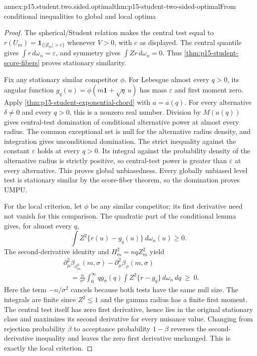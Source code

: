 \begin{annexitem}{annex:p15.student.two.sided.optimal}{thm:p15-student-two-sided-optimal}{From conditional inequalities to global and local optima}
\begin{proof}
The spherical/Student relation makes the
central test equal to
\(r(U_m)=\mathbf1_{\{|Z_m|>c\}}\) whenever
\(V>0\), with \(c\) as displayed.
The central quantile gives
\(\int r\,d\omega_n=\varepsilon\), and
symmetry gives \(\int Zr\,d\omega_n=0\).
Thus \cref{thm:p15-student-score-fibers}
proves stationary similarity.

Fix any stationary similar competitor \(\phi\).
For Lebesgue almost every \(q>0\), its angular
function \(g_q(u)=\phi(m\mathbf1+\sqrt q\,u)\)
has mass \(\varepsilon\) and first moment zero.
Apply \cref{thm:p15-student-exponential-chord}
with \(a=a(q)\). For every alternative
\(\delta\ne0\) and every \(q>0\), this is a
nonzero real number. Division by \(M(a(q))\)
gives central-test domination of conditional
alternative power at almost every radius.
The common exceptional set is null for the
alternative radius density, and integration
gives unconditional domination.
The strict inequality against the constant
\(\varepsilon\) holds at every \(q>0\).
Its integral against the probability density
of the alternative radius is strictly positive,
so central-test power is greater than
\(\varepsilon\) at every alternative.
This proves global unbiasedness.
Every globally unbiased level test is
stationary similar by the score-fiber theorem,
so the domination proves UMPU.

For the local criterion, let \(\phi\) be
any similar competitor; its first derivative
need not vanish for this comparison.
The quadratic part of the conditional lemma
gives, for almost every \(q\),
\[
 \int Z^2\{r(u)-g_q(u)\}\,d\omega_n(u)\geq0.
\]
The second-derivative identity and
\(H_m^2=nqZ_m^2\) yield
\[
\begin{split}
 &\partial_\mu^2\beta_{\phi_m^0}(m,\sigma)
        -\partial_\mu^2\beta_\phi(m,\sigma)\\
 &\quad=\frac n{\sigma^4}
      \int_0^\infty q g_\sigma(q)
          \int Z^2\{r-g_q\}\,d\omega_n\,dq
       \ \geq\ 0 .
\end{split}
\]
Here the term \(-n/\sigma^2\) cancels because
both tests have the same null size.
The integrals are finite since \(Z^2\leq1\)
and the gamma radius has a finite first moment.
The central test itself has zero first
derivative, hence lies in the original
stationary class and maximizes its second
derivative for every nuisance value.
Changing from rejection probability \(\beta\)
to acceptance probability \(1-\beta\)
reverses the second-derivative inequality
and leaves the zero first derivative unchanged.
This is exactly the local criterion.
\end{proof}
\end{annexitem}

